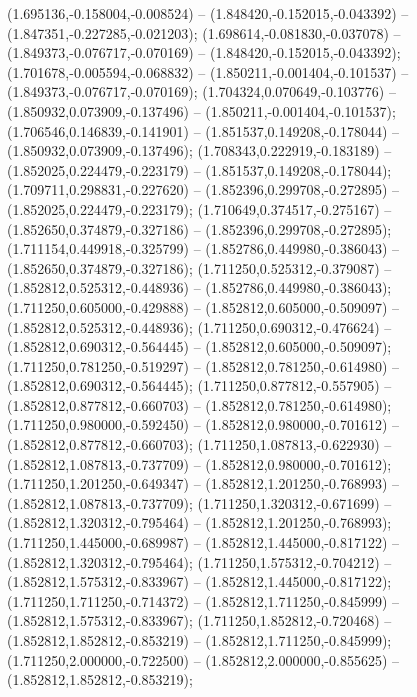  (1.695136,-0.158004,-0.008524) -- (1.848420,-0.152015,-0.043392) -- (1.847351,-0.227285,-0.021203);
 (1.698614,-0.081830,-0.037078) -- (1.849373,-0.076717,-0.070169) -- (1.848420,-0.152015,-0.043392);
 (1.701678,-0.005594,-0.068832) -- (1.850211,-0.001404,-0.101537) -- (1.849373,-0.076717,-0.070169);
 (1.704324,0.070649,-0.103776) -- (1.850932,0.073909,-0.137496) -- (1.850211,-0.001404,-0.101537);
 (1.706546,0.146839,-0.141901) -- (1.851537,0.149208,-0.178044) -- (1.850932,0.073909,-0.137496);
 (1.708343,0.222919,-0.183189) -- (1.852025,0.224479,-0.223179) -- (1.851537,0.149208,-0.178044);
 (1.709711,0.298831,-0.227620) -- (1.852396,0.299708,-0.272895) -- (1.852025,0.224479,-0.223179);
 (1.710649,0.374517,-0.275167) -- (1.852650,0.374879,-0.327186) -- (1.852396,0.299708,-0.272895);
 (1.711154,0.449918,-0.325799) -- (1.852786,0.449980,-0.386043) -- (1.852650,0.374879,-0.327186);
 (1.711250,0.525312,-0.379087) -- (1.852812,0.525312,-0.448936) -- (1.852786,0.449980,-0.386043);
 (1.711250,0.605000,-0.429888) -- (1.852812,0.605000,-0.509097) -- (1.852812,0.525312,-0.448936);
 (1.711250,0.690312,-0.476624) -- (1.852812,0.690312,-0.564445) -- (1.852812,0.605000,-0.509097);
 (1.711250,0.781250,-0.519297) -- (1.852812,0.781250,-0.614980) -- (1.852812,0.690312,-0.564445);
 (1.711250,0.877812,-0.557905) -- (1.852812,0.877812,-0.660703) -- (1.852812,0.781250,-0.614980);
 (1.711250,0.980000,-0.592450) -- (1.852812,0.980000,-0.701612) -- (1.852812,0.877812,-0.660703);
 (1.711250,1.087813,-0.622930) -- (1.852812,1.087813,-0.737709) -- (1.852812,0.980000,-0.701612);
 (1.711250,1.201250,-0.649347) -- (1.852812,1.201250,-0.768993) -- (1.852812,1.087813,-0.737709);
 (1.711250,1.320312,-0.671699) -- (1.852812,1.320312,-0.795464) -- (1.852812,1.201250,-0.768993);
 (1.711250,1.445000,-0.689987) -- (1.852812,1.445000,-0.817122) -- (1.852812,1.320312,-0.795464);
 (1.711250,1.575312,-0.704212) -- (1.852812,1.575312,-0.833967) -- (1.852812,1.445000,-0.817122);
 (1.711250,1.711250,-0.714372) -- (1.852812,1.711250,-0.845999) -- (1.852812,1.575312,-0.833967);
 (1.711250,1.852812,-0.720468) -- (1.852812,1.852812,-0.853219) -- (1.852812,1.711250,-0.845999);
 (1.711250,2.000000,-0.722500) -- (1.852812,2.000000,-0.855625) -- (1.852812,1.852812,-0.853219);
